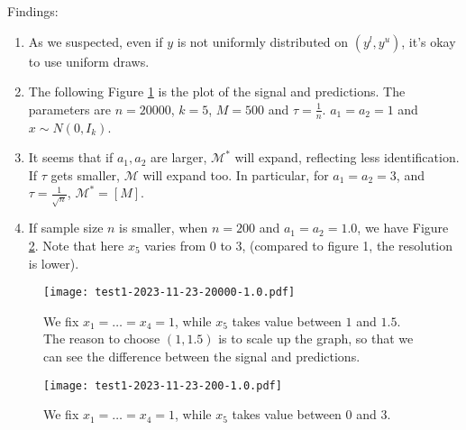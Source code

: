 \documentclass[12pt]{article}
\begin{document}
    Findings:
    \begin{enumerate}
        \item As we suspected, even if \(y\) is not uniformly distributed on \((y^{l},y^{u})\), it's okay to use uniform draws. 
        
        \item The following Figure \ref{fig:1} is the plot of the signal and predictions.  The parameters are \(n = 20000\), \(k = 5\), \(M = 500\) and \(\tau = \frac{1}{n}\). \(a_{1} = a_{2} = 1\) and \(x \sim N(0,I_{k})\). 

        
        \item It seems that if \(a_{1},a_{2}\) are larger, \(\mathcal{M}^{*}\) will expand, reflecting less identification. If \(\tau\) gets smaller, \(\mathcal{M}\) will expand too. In particular, for \(a_{1} = a_{2} = 3\), and \(\tau = \frac{1}{\sqrt{n}}\), \(\mathcal{M}^{*} = [M]\). 
        \item If sample size \(n\) is smaller, when \(n = 200\) and \(a_{1} = a_{2} = 1.0\), we have Figure \ref{fig:2}. Note that here \(x_{5}\) varies from \(0\) to \(3\), (compared to figure 1, the resolution is lower). 
    \end{enumerate}


        \begin{figure}[h]
            \centering
            \texttt{[image: test1-2023-11-23-20000-1.0.pdf]}
            \caption{We fix \(x_{1} = \dots = x_{4} = 1\), while \(x_{5}\) takes value between \(1\) and \(1.5\). The reason to choose \((1,1.5)\) is to scale up the graph, so that we can see the difference between the signal and predictions.}
            \label{fig:1}
        \end{figure}
        \begin{figure}
            \centering
            \texttt{[image: test1-2023-11-23-200-1.0.pdf]}
            \caption{We fix \(x_{1} = \dots = x_{4} = 1\), while \(x_{5}\) takes value between \(0\) and \(3\).}
            \label{fig:2}
        \end{figure}

\end{document}
